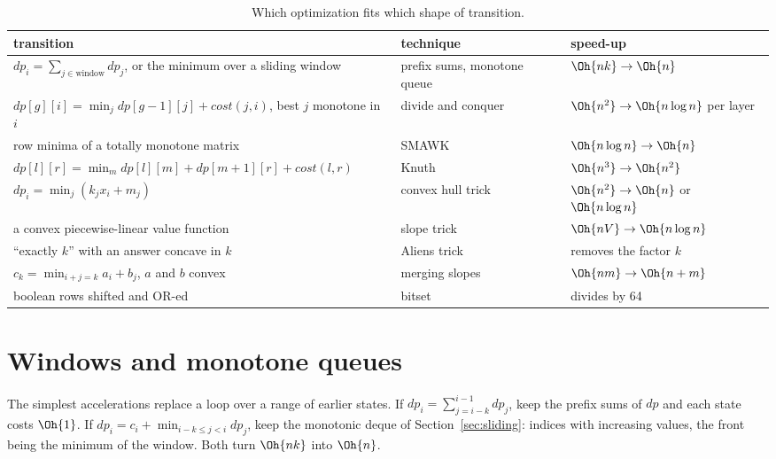 \begin{table}[htbp]
\centering\small
\begin{tabularx}{\linewidth}{@{}>{\raggedright\arraybackslash}p{6.2cm}>{\raggedright\arraybackslash}p{3.4cm}X@{}}
\toprule
transition & technique & speed-up \\
\midrule
$dp_i = \sum_{j \in \text{window}} dp_j$, or the minimum over a sliding window & prefix sums, monotone queue & $\Oh{nk} \to \Oh{n}$ \\
$dp[g][i] = \min_j dp[g-1][j] + \mathit{cost}(j, i)$, best $j$ monotone in $i$ & divide and conquer & $\Oh{n^2} \to \Oh{n \log n}$ per layer \\
row minima of a totally monotone matrix & SMAWK & $\Oh{n \log n} \to \Oh{n}$ \\
$dp[l][r] = \min_m dp[l][m] + dp[m+1][r] + \mathit{cost}(l, r)$ & Knuth & $\Oh{n^3} \to \Oh{n^2}$ \\
$dp_i = \min_j (k_j x_i + m_j)$ & convex hull trick & $\Oh{n^2} \to \Oh{n}$ or $\Oh{n \log n}$ \\
a convex piecewise-linear value function & slope trick & $\Oh{nV} \to \Oh{n \log n}$ \\
``exactly $k$'' with an answer concave in $k$ & Aliens trick & removes the factor $k$ \\
$c_k = \min_{i + j = k} a_i + b_j$, $a$ and $b$ convex & merging slopes & $\Oh{nm} \to \Oh{n + m}$ \\
boolean rows shifted and OR-ed & bitset & divides by 64 \\
\bottomrule
\end{tabularx}
\caption{Which optimization fits which shape of transition.}
\label{tab:dpopt}
\end{table}

\section[Windows and monotone queues]{Windows and monotone queues \hfill \gold}\label{sec:dpopt-window}

The simplest accelerations replace a loop over a range of earlier states. If $dp_i = \sum_{j=i-k}^{i-1} dp_j$, keep the prefix sums
of $dp$ and each state costs $\Oh{1}$. If $dp_i = c_i + \min_{i - k \le j < i} dp_j$, keep the monotonic deque of
Section~\ref{sec:sliding}: indices with increasing values, the front being the minimum of the window. Both turn $\Oh{nk}$ into
$\Oh{n}$.

